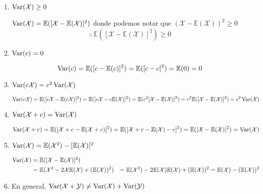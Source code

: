 \begin{enumerate}
\item $\operatorname{Var}(\mathcal X) \ge 0$
  \begin{myproof}
    $\operatorname{Var}(\mathcal X) = \mathbb E([\mathcal X - \mathbb E(\mathcal X)]^2)$ donde podemos notar que $(\mathcal X - \mathbb E(\mathcal X))^2 \ge 0$
    \[\therefore \, \mathbb E([\mathcal X - \mathbb E(\mathcal X)]^2) \ge 0 \]
  \end{myproof}
\item $\operatorname{Var}(c) = 0$
  \begin{myproof}
    \[\operatorname{Var}(c) = \mathbb E([c - \mathbb E(c)]^2) = \mathbb E([c - c]^2) = \mathbb E(0) = 0\]
  \end{myproof}
\item $\operatorname{Var}(c \mathcal X) = c^2 \operatorname{Var}(\mathcal X)$
  \begin{myproof}
    \[\operatorname{Var}(c\mathcal X) = \mathbb E([c\mathcal X - \mathbb E(c\mathcal X)]^2) = \mathbb E([c\mathcal X - c\mathbb E(\mathcal X)]^2) = \mathbb E(c^2[\mathcal X - \mathbb E(\mathcal X)]^2) = c^2\mathbb E([\mathcal X - \mathbb E(\mathcal X)]^2) = c^2 \operatorname{Var}(\mathcal X)\]
  \end{myproof}
\item $\operatorname{Var}(\mathcal X + c) = \operatorname{Var}(\mathcal X)$
  \begin{myproof}
    \[\operatorname{Var}(\mathcal X + c) = \mathbb E([\mathcal X + c - \mathbb E(\mathcal X + c)]^2) = \mathbb E([\mathcal X + c - \mathbb E(\mathcal X) - c]^2) = \mathbb E([\mathcal X - \mathbb E(\mathcal X)]^2) = \operatorname{Var}(\mathcal X)\]
  \end{myproof}
\item $\operatorname{Var}(\mathcal X) = \mathbb E(\mathcal X^2) - [\mathbb E(\mathcal X)]^2$
  \begin{myproof}
    \begin{align*}
      \operatorname{Var}(\mathcal X) &= \mathbb E([\mathcal X - \mathbb E(\mathcal X)]^2)\\
                             &= \mathbb E(\mathcal X^2 - 2\mathcal X\mathbb E(\mathcal X) + (\mathbb E(\mathcal X))^2)
                             &= \mathbb E(\mathcal X^2) - 2 \mathbb E(\mathcal X) \mathbb E(\mathcal X) + (\mathbb E(\mathcal X))^2 = \mathbb E(\mathcal X) - (\mathbb E(\mathcal X))^2
    \end{align*}
  \end{myproof}
\item En general, $\operatorname{Var}(\mathcal X + \mathcal Y) \neq \operatorname{Var}(\mathcal X) +\operatorname{Var}(\mathcal Y)$
  \begin{myproof}
    \begin{align*}

\end{align*}
\end{myproof}
\end{enumerate}
